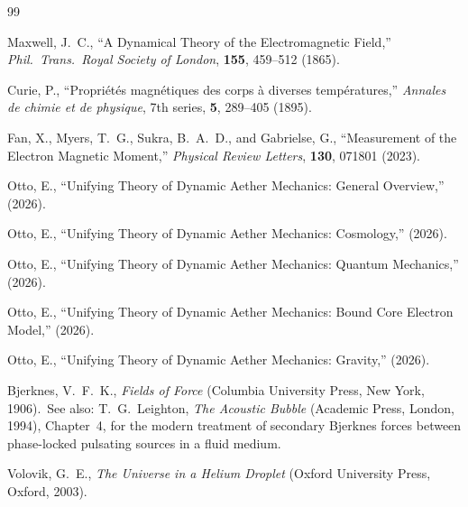﻿\documentclass[12pt,letterpaper]{article}
\begin{document}
\begin{thebibliography}{99}

Maxwell, J.~C.,
``A Dynamical Theory of the Electromagnetic Field,''
\textit{Phil.\ Trans.\ Royal Society of London}, \textbf{155}, 459--512 (1865).


Curie, P.,
``Propri\'{e}t\'{e}s magn\'{e}tiques des corps \`{a} diverses temp\'{e}ratures,''
\textit{Annales de chimie et de physique}, 7th series, \textbf{5}, 289--405 (1895).




Fan, X., Myers, T.~G., Sukra, B.~A.~D., and Gabrielse, G.,
``Measurement of the Electron Magnetic Moment,''
\textit{Physical Review Letters}, \textbf{130}, 071801 (2023).

Otto, E.,
``Unifying Theory of Dynamic Aether Mechanics: General Overview,''
(2026).

Otto, E.,
``Unifying Theory of Dynamic Aether Mechanics: Cosmology,''
(2026).

Otto, E.,
``Unifying Theory of Dynamic Aether Mechanics: Quantum Mechanics,''
(2026).

Otto, E.,
``Unifying Theory of Dynamic Aether Mechanics: Bound Core Electron Model,''
(2026).

Otto, E.,
``Unifying Theory of Dynamic Aether Mechanics: Gravity,''
(2026).

Bjerknes, V.~F.~K.,
\textit{Fields of Force}
(Columbia University Press, New York, 1906).\
See also: T.~G.~Leighton, \textit{The Acoustic Bubble}
(Academic Press, London, 1994), Chapter~4, for the modern treatment of
secondary Bjerknes forces between phase-locked pulsating sources in a fluid medium.

Volovik, G.~E.,
\textit{The Universe in a Helium Droplet}
(Oxford University Press, Oxford, 2003).
\end{thebibliography}
\end{document}
